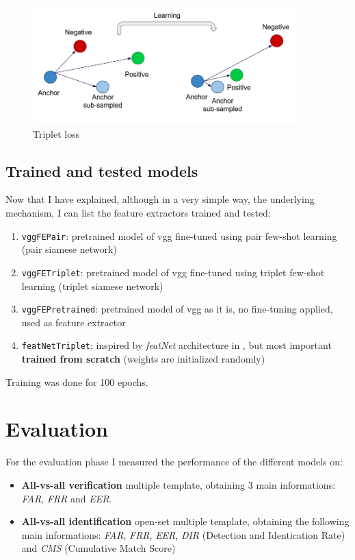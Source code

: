 \documentclass{article}
\begin{document}
\begin{figure}[H]
    \centering
    \includegraphics[width=4in]{imgs/Scheme-of-the-learning-process-of-our-adapted-triplet-loss-function-See-the-Equation-6.png}
    \caption{Triplet loss}
    \label{fig:tripletNet}
\end{figure}

\subsection{Trained and tested models}
Now that I have explained, although in a very simple way, the underlying mechanism, I can list the feature extractors trained and tested:
\begin{enumerate}
    \item \texttt{vggFEPair}: pretrained model of vgg fine-tuned using pair few-shot learning (pair siamese network)
    \item \texttt{vggFETriplet}: pretrained model of vgg fine-tuned using triplet few-shot learning (triplet siamese network)
    \item \texttt{vggFEPretrained}: pretrained model of vgg as it is, no fine-tuning applied, used as feature extractor
    \item \texttt{featNetTriplet}: inspired by \textit{featNet} architecture in \cite{9036930}, but most important \textbf{trained from scratch} (weights are initialized randomly)
\end{enumerate}

Training was done for 100 epochs.

\section{Evaluation}
For the evaluation phase I measured the performance of the different models on:
\begin{itemize}
    \item \textbf{All-vs-all verification} multiple template, obtaining 3 main informations: \textit{FAR}, \textit{FRR} and \textit{EER}.
    \item \textbf{All-vs-all identification} open-set multiple template, obtaining the following main informations: \textit{FAR}, \textit{FRR}, \textit{EER}, \textit{DIR} (Detection and Identication Rate) and \textit{CMS} (Cumulative Match Score)
\end{itemize}
\end{document}

